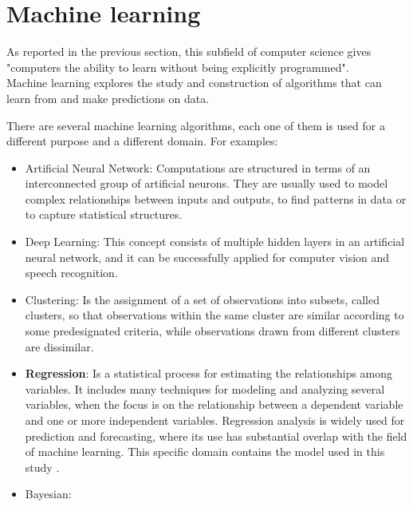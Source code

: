 \newpage


\section{Machine learning}
\vspace{-5mm}
\label{ML}
As reported in the previous section, this subfield of computer science gives "computers the ability to learn without being explicitly programmed". \\
Machine learning explores the study and construction of algorithms that can learn from and make predictions on data.

There are several machine learning algorithms, each one of them is used for a different purpose and a different domain. For examples:
  \vspace{-5mm}
\begin{itemize}
 
  \item Artificial Neural Network: Computations are structured in terms of an interconnected group of artificial neurons. They are usually used to model complex relationships between inputs and outputs, to find patterns in data or to capture statistical structures. 
  
  \item Deep Learning: This concept consists of multiple hidden layers in an artificial neural network, and it can be successfully applied for computer vision and speech recognition.
  
  \item Clustering: Is the assignment of a set of observations into subsets, called clusters, so that observations within the same cluster are similar according to some predesignated criteria, while observations drawn from different clusters are dissimilar.
  
  \item \textbf{Regression}: Is a statistical process for estimating the relationships among variables. It includes many techniques for modeling and analyzing several variables, when the focus is on the relationship between a dependent variable and one or more independent variables. Regression analysis is widely used for prediction and forecasting, where its use has substantial overlap with the field of machine learning. This specific domain contains the model used in this study \cite{wiki:Regression}.
  
  \item Bayesian:
  
 \end{itemize}  

